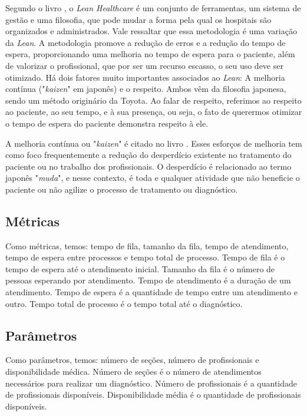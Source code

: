 \documentclass[
    12pt,                %
    openright,           %
    oneside,             %
    a4paper,             %
    english,             %
    brazil               %
]{abntex2}
\begin{document}
Segundo o livro , o \textit{Lean Healthcare} é um conjunto de ferramentas, um sistema de gestão e uma filosofia, que pode mudar a forma pela qual os hospitais são organizados e administrados. Vale ressaltar que essa metodologia é uma variação da \textit{Lean}. A metodologia promove a redução de erros e a redução do tempo de espera, proporcionando uma melhoria no tempo de espera para o paciente, além de valorizar o profissional, que por ser um recurso escasso, o seu uso deve ser otimizado. Há dois fatores muito importantes associados ao \textit{Lean}: A melhoria contínua ("\textit{kaizen}" em japonês) e o respeito. Ambos vêm da filosofia japonesa, sendo um método originário da Toyota. Ao falar de respeito, referimos ao respeito ao paciente, ao seu tempo, e à sua presença, ou seja, o fato de querermos otimizar o tempo de espera do paciente demonstra respeito à ele.

A melhoria contínua ou "\textit{kaizen}" é citado no livro . Esses esforços de melhoria tem como foco frequentemente a redução do desperdício existente no tratamento do paciente ou no trabalho dos profissionais. O desperdício é relacionado ao termo japonês "\textit{muda}", e nesse contexto, é toda e qualquer atividade que não beneficie o paciente ou não agilize o processo de tratamento ou diagnóstico.

\subsection{Métricas}

Como métricas, temos: tempo de fila, tamanho da fila, tempo de atendimento, tempo de espera entre processos e tempo total de processo. Tempo de fila é o tempo de espera até o atendimento inicial. Tamanho da fila é o número de pessoas esperando por atendimento. Tempo de atendimento é a duração de um atendimento. Tempo de espera é a quantidade de tempo entre um atendimento e outro. Tempo total de processo é o tempo total até o diagnóstico. 

\subsection{Parâmetros}

Como parâmetros, temos: número de seções, número de profissionais e disponibilidade médica. Número de seções é o número de atendimentos necessários para realizar um diagnóstico. Número de profissionais é a quantidade de profissionais disponíveis. Disponibilidade média é o quantidade de profissionais disponíveis.
\end{document}
